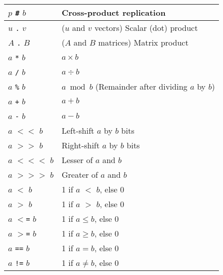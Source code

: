 \begin{tabular}{|l|l|}
    \\
        $p$
        \texttt{\#}
        $b$
       & 
      Cross-product replication
    \\
    \hline
        $u$
        \texttt{.}
        $v$
       & 
      ($u$ and $v$ vectors) Scalar (dot) product
    \\
        $A$
        \texttt{.}
        $B$
       & 
      ($A$ and $B$ matrices) Matrix product
    \\
    \hline
        $a$
        \texttt{*}
        $b$
       & 
      $a \times b$
    \\
        $a$
        \texttt{/}
        $b$
       & 
      $a \div b$
    \\
        $a$
        \texttt{\%}
        $b$
       & 
      $a \bmod b$ (Remainder after dividing $a$ by $b$)
    \\
    \hline
        $a$
        \texttt{+}
        $b$
       & 
      $a+b$
    \\
        $a$
        \texttt{-}
        $b$
       & 
      $a-b$
    \\
    \hline
        $a$
        \texttt{$<$$<$}
        $b$
       & 
      Left-shift 
      $a$ by 
      $b$ bits
    \\
        $a$
        \texttt{$>$$>$}
        $b$
       & 
      Right-shift 
      $a$ by 
      $b$ bits
    \\
    \hline
        $a$
        \texttt{$<$$<$$<$}
        $b$
       & 
      Lesser of 
      $a$ and 
      $b$
    \\
        $a$
        \texttt{$>$$>$$>$}
        $b$
       & 
      Greater of 
      $a$ and 
      $b$
    \\
    \hline
        $a$
        \texttt{$<$}
        $b$
       & 
      1 if 
      $a$ $<$ 
      $b$, else 0
    \\
        $a$
        \texttt{$>$}
        $b$
       & 
      1 if 
      $a$ $>$ 
      $b$, else 0
    \\
        $a$
        \texttt{$<$=}
        $b$
       & 
      1 if 
      $a \le b$, else 0
    \\
        $a$
        \texttt{$>$=}
        $b$
       & 
      1 if 
      $a \ge b$, else 0
    \\
    \hline
        $a$
        \texttt{==}
        $b$
       & 
      1 if 
      $a = b$, else 0
    \\
        $a$
        \texttt{!=}
        $b$
       & 
      1 if 
      $a \neq b$, else 0
    \\

\end{tabular}
